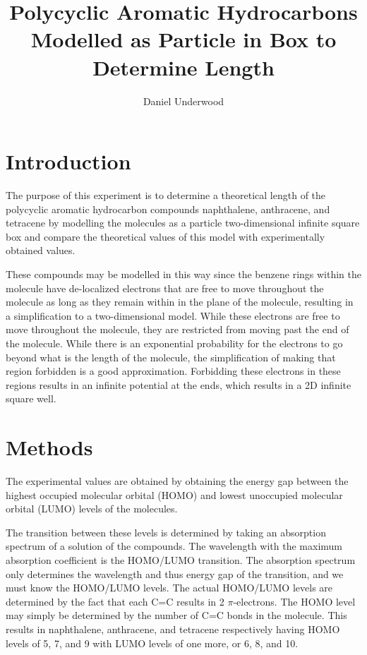 \documentclass[10pt,a4paper]{article}
\author{Daniel Underwood}
\title{Polycyclic Aromatic Hydrocarbons Modelled as Particle in Box to Determine Length}
\begin{document}
\maketitle

\section*{Introduction}

The purpose of this experiment is to determine a theoretical length of the polycyclic aromatic hydrocarbon compounds naphthalene, anthracene, and tetracene by modelling the molecules as a particle two-dimensional infinite square box and compare the theoretical values of this model with experimentally obtained values.

These compounds may be modelled in this way since the benzene rings within the molecule have de-localized electrons that are free to move throughout the molecule as long as they remain within in the plane of the molecule, resulting in a simplification to a two-dimensional model. While these electrons are free to move throughout the molecule, they are restricted from moving past the end of the molecule. While there is an exponential probability for the electrons to go beyond what is the length of the molecule, the simplification of making that region forbidden is a good approximation. Forbidding these electrons in these regions results in an infinite potential at the ends, which results in a 2D infinite square well.

\section*{Methods}

The experimental values are obtained by obtaining the energy gap between the highest occupied molecular orbital (HOMO) and lowest unoccupied molecular orbital (LUMO) levels of the molecules.

The transition between these levels is determined by taking an absorption spectrum of a solution of the compounds. The wavelength with the maximum absorption coefficient is the HOMO/LUMO transition. The absorption spectrum only determines the wavelength and thus energy gap of the transition, and we must know the HOMO/LUMO levels. The actual HOMO/LUMO levels are determined by the fact that each C=C results in 2 $\pi$-electrons. The HOMO level may simply be determined by the number of C=C bonds in the molecule. This results in naphthalene, anthracene, and tetracene  respectively having HOMO levels of 5, 7, and 9 with LUMO levels of one more, or 6, 8, and 10.
\end{document}
